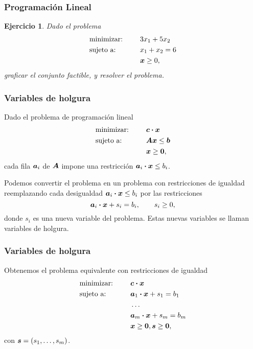 \documentclass[aspectratio=169,12pt,spanish]{beamer}
\newtheorem{ejercicio}{Ejercicio}
\begin{document}

\begin{frame}
\frametitle{Programación Lineal}

\begin{ejercicio}
Dado el problema
\begin{alignat*}{2}
  & \text{minimizar: } & & 3 x_1 + 5 x_2 \\
   & \text{sujeto a: } & \quad & x_1 + x_2 = 6 \\
   & & & \bm{x} \ge 0,
\end{alignat*}
graficar el conjunto factible, y resolver el problema.
\end{ejercicio}

\end{frame}

\begin{frame}
\frametitle{Variables de holgura}

Dado el problema de programación lineal
\begin{alignat*}{2}
  & \text{minimizar: } & & \bm{c} \boldsymbol{\cdot} \bm{x} \\
   & \text{sujeto a: } & \quad & \bm{A}\bm{x} \le \bm{b} \\
   & & & \bm{x} \ge \bm{0},
\end{alignat*}
cada fila $\bm{a}_i$ de $\bm{A}$ impone una restricción $\bm{a}_i \boldsymbol{\cdot} \bm{x} \le b_i$.

Podemos convertir el problema en un problema con restricciones de igualdad reemplazando cada desigualdad $\bm{a}_i \boldsymbol{\cdot} \bm{x} \le b_i$ por las restricciones
$$\bm{a}_i \boldsymbol{\cdot} \bm{x} + s_i =  b_i, \quad \quad s_i \ge 0,$$
donde $s_i$ es una nueva variable del problema. Estas nuevas variables se llaman variables de holgura.

\end{frame}

\begin{frame}
\frametitle{Variables de holgura}

Obtenemos el problema equivalente con restricciones de igualdad
\begin{alignat*}{2}
  & \text{minimizar: } & & \bm{c} \boldsymbol{\cdot} \bm{x} \\
   & \text{sujeto a: } & \quad & \bm{a}_1 \boldsymbol{\cdot} \bm{x} + s_1 = b_1 \\
   &  & \quad & \dots \\
   &  & \quad & \bm{a}_m \boldsymbol{\cdot} \bm{x} + s_m = b_m \\
   & & & \bm{x} \ge \bm{0}, \bm{s} \ge \bm{0},
\end{alignat*}
con $\bm{s} = (s_1, \dots, s_m)$.

\end{frame}
\end{document}
